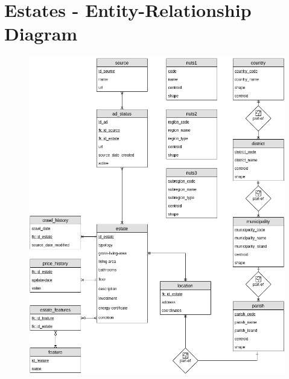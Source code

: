\chapter{Estates - Entity-Relationship Diagram} 
\label{apx:er-estates}

\begin{figure}[h]
    \centering
    \includegraphics[width=1\textwidth]{Chapters/img/4_realEstateData/EA_Estates.png}
    \label{fig:apx-er-estates}
\end{figure}